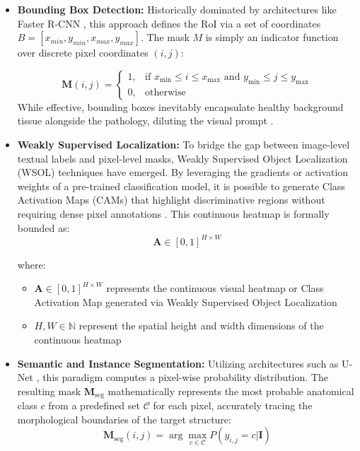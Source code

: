\begin{itemize}
\item \textbf{Bounding Box Detection:} Historically dominated by architectures like Faster R-CNN \cite{ren2015faster-rcnn}, this approach defines the RoI via a set of coordinates $B=[x_{min},y_{min},x_{max},y_{max}]$. The mask $M$ is simply an indicator function over discrete pixel coordinates $(i,j)$:

$$\mathbf{M}(i,j) = \begin{cases} 1, & \text{if } x_{\min} \le i \le x_{\max} \text{ and } y_{\min} \le j \le y_{\max} \\ 0, & \text{otherwise} \end{cases}$$
While effective, bounding boxes inevitably encapsulate healthy background tissue alongside the pathology, diluting the visual prompt \cite{anderson2018bottom-up}.

\item \textbf{Weakly Supervised Localization:} To bridge the gap between image-level textual labels and pixel-level masks, Weakly Supervised Object Localization (WSOL) techniques have emerged. By leveraging the gradients or activation weights of a pre-trained classification model, it is possible to generate Class Activation Maps (CAMs) that highlight discriminative regions without requiring dense pixel annotations \cite{zhou2016cam}. This continuous heatmap is formally bounded as:
\begin{equation}
\mathbf{A} \in [0,1]^{H \times W}
\end{equation}

where:
\begin{itemize}
\item $\mathbf{A} \in [0,1]^{H \times W}$ represents the continuous visual heatmap or Class Activation Map generated via Weakly Supervised Object Localization
\item $H, W \in \mathbb{N}$ represent the spatial height and width dimensions of the continuous heatmap
\end{itemize}

\item \textbf{Semantic and Instance Segmentation:} Utilizing architectures such as U-Net \cite{ronneberger2015unet}, this paradigm computes a pixel-wise probability distribution. The resulting mask $\mathbf{M}_{\text{seg}}$ mathematically represents the most probable anatomical class $c$ from a predefined set $\mathcal{C}$ for each pixel, accurately tracing the morphological boundaries of the target structure:
\begin{equation}
\mathbf{M}_{\text{seg}}(i,j) = \arg\max_{c \in \mathcal{C}} P(y_{i,j} = c | \mathbf{I})
\end{equation}


\end{itemize}
